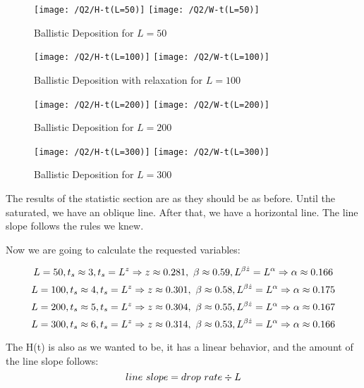 \documentclass{article}
\begin{document}
    \begin{figure}[!htb]
        \centering
        \texttt{[image: /Q2/H-t(L=50)]}
        \label{fig:2.2}
        \texttt{[image: /Q2/W-t(L=50)]}
        \label{fig:2.3}
        \caption{Ballistic Deposition for $L=50$}
    \end{figure}
    \begin{figure}[!htb]
        \centering
        \texttt{[image: /Q2/H-t(L=100)]}
        \label{fig:2.4}
        \texttt{[image: /Q2/W-t(L=100)]}
        \label{fig:2.5}
        \caption{Ballistic Deposition with relaxation for $L=100$}
    \end{figure}
    \begin{figure}[!htb]
        \centering
        \texttt{[image: /Q2/H-t(L=200)]}
        \label{fig:2.6}
        \texttt{[image: /Q2/W-t(L=200)]}
        \label{fig:2.7}
        \caption{Ballistic Deposition for $L=200$}
    \end{figure}
    \begin{figure}[!htb]
        \centering
        \texttt{[image: /Q2/H-t(L=300)]}
        \label{fig:2.8}
        \texttt{[image: /Q2/W-t(L=300)]}
        \label{fig:2.9}
        \caption{Ballistic Deposition for $L=300$}
    \end{figure}

    The results of the statistic section are as they should be as before.
    Until the saturated, we have an oblique line.
    After that, we have a horizontal line.
    The line slope follows the rules we knew.

    Now we are going to calculate the requested variables:

    \begin{equation}
        \centering
        L = 50, t_{s} \approx 3, t_{s} = L^z \Rightarrow z \approx 0.281,\
        \beta \approx 0.59, L^{\beta \dot z} = L^{\alpha} \Rightarrow \alpha \approx 0.166
    \end{equation}
    \begin{equation}
        \centering
        L = 100, t_{s} \approx 4, t_{s} = L^z \Rightarrow z \approx 0.301,\
        \beta \approx 0.58, L^{\beta \dot z} = L^{\alpha} \Rightarrow \alpha \approx 0.175
    \end{equation}
    \begin{equation}
        \centering
        L = 200, t_{s} \approx 5, t_{s} = L^z \Rightarrow z \approx 0.304,\
        \beta \approx 0.55, L^{\beta \dot z} = L^{\alpha} \Rightarrow \alpha \approx 0.167
    \end{equation}
    \begin{equation}
        \centering
        L = 300, t_{s} \approx 6, t_{s} = L^z \Rightarrow z \approx 0.314,\
        \beta \approx 0.53, L^{\beta \dot z} = L^{\alpha} \Rightarrow \alpha \approx 0.166
    \end{equation}

    The H(t) is also as we wanted to be, it has a linear behavior,
    and the amount of the line slope follows:
    \begin{equation}
        \centering
        line \ slope = drop \ rate \div L
    \end{equation}
\end{document}
